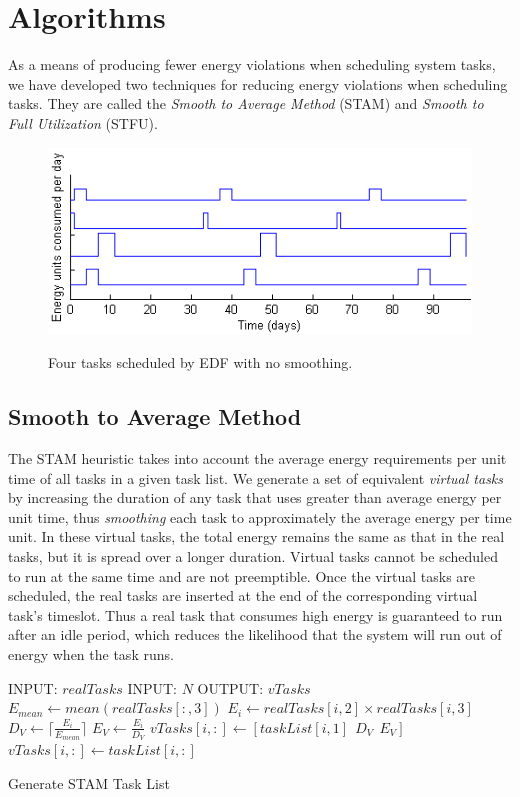
\section{Algorithms} \label{sec:algorithms}

As a means of producing fewer energy violations when scheduling system tasks, we have developed two techniques for reducing energy violations when scheduling tasks.  They are called the \emph{Smooth to Average Method} (\textsc{STAM}) and \emph{Smooth to Full Utilization} (\textsc{STFU}). 
\begin{figure}[htb]
\includegraphics[scale=0.72]{edftasks.png}
\label{fig:edftasksched}
\caption{Four tasks scheduled by EDF with no smoothing.}
\end{figure}
\subsection{Smooth to Average Method}
The STAM heuristic takes into account the average energy requirements per unit time of all tasks in a given task list. We generate a set of equivalent \emph{virtual tasks} by increasing the duration of any task that uses greater than average energy per unit time, thus \emph{smoothing} each task to approximately the average energy per time unit. In these virtual tasks, the total energy remains the same as that in the real tasks, but it is spread over a longer duration.  Virtual tasks cannot be scheduled to run at the same time and are not preemptible.  Once the virtual tasks are scheduled, the real tasks are inserted at the end of the corresponding virtual task's timeslot.  Thus a real task that consumes high energy is guaranteed to run after an idle period, which reduces the likelihood that the system will run out of energy when the task runs.

\begin{algorithm}[htb]
\label{stamalg}
\begin{algorithmic}
\STATE INPUT: $realTasks$  
\STATE INPUT: $N$ 
\STATE OUTPUT: $vTasks$ 
\STATE $E_{mean} \gets mean(realTasks[:,3])$
\STATE $E_i \gets realTasks[i, 2] \times realTasks[i,3]$
\STATE $D_V \gets \lceil \frac{E_i}{E_{mean}} \rceil$
\STATE $E_V \gets \frac{E_i}{D_V}$
\STATE $vTasks[i,:] \gets [taskList[i,1]~~D_V~~E_V]$
\ELSE
\STATE $vTasks[i,:] \gets taskList[i,:]$
\ENDIF
\ENDFOR
\end{algorithmic}
\caption{Generate \textsc{STAM} Task List}
\end{algorithm}

